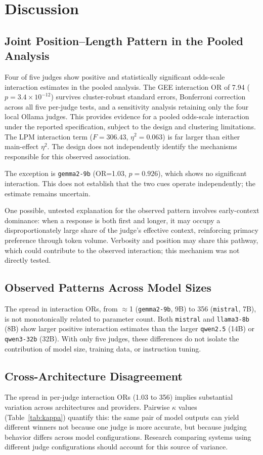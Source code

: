\documentclass[10pt,conference]{IEEEtran}
\begin{document}
\section{Discussion}
\subsection{Joint Position--Length Pattern in the Pooled Analysis}
Four of five judges show positive and statistically significant odds-scale interaction estimates in the pooled analysis. The GEE interaction OR of 7.94 ($p=3.4\times10^{-12}$) survives cluster-robust standard errors, Bonferroni correction across all five per-judge tests, and a sensitivity analysis retaining only the four local Ollama judges. This provides evidence for a pooled odds-scale interaction under the reported specification, subject to the design and clustering limitations. The LPM interaction term ($F=306.43$, $\eta^2=0.063$) is far larger than either main-effect $\eta^2$. The design does not independently identify the mechanisms responsible for this observed association.

The exception is \texttt{gemma2-9b} (OR=1.03, $p=0.926$), which shows no significant interaction. This does not establish that the two cues operate independently; the estimate remains uncertain.

One possible, untested explanation for the observed pattern involves early-context dominance: when a response is both first and longer, it may occupy a disproportionately large share of the judge's effective context, reinforcing primacy preference through token volume. Verbosity and position may share this pathway, which could contribute to the observed interaction; this mechanism was not directly tested.

\subsection{Observed Patterns Across Model Sizes}
The spread in interaction ORs, from $\approx$1 (\texttt{gemma2-9b}, 9B) to 356 (\texttt{mistral}, 7B), is not monotonically related to parameter count. Both \texttt{mistral} and \texttt{llama3-8b} (8B) show larger positive interaction estimates than the larger \texttt{qwen2.5} (14B) or \texttt{qwen3-32b} (32B). With only five judges, these differences do not isolate the contribution of model size, training data, or instruction tuning.

\subsection{Cross-Architecture Disagreement}
The spread in per-judge interaction ORs (1.03 to 356) implies substantial variation across architectures and providers. Pairwise $\kappa$ values (Table~\ref{tab:kappa}) quantify this: the same pair of model outputs can yield different winners not because one judge is more accurate, but because judging behavior differs across model configurations. Research comparing systems using different judge configurations should account for this source of variance.
\end{document}
